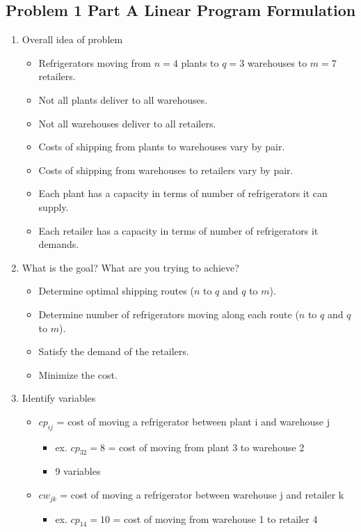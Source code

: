 \documentclass[../report/main.tex]{subfiles}
\begin{document}
\subsection*{Problem 1 Part A Linear Program Formulation}
\begin{enumerate}[1.]
	\item Overall idea of problem
	\begin{itemize}
		\item Refrigerators moving from $n=4$ plants to $q=3$ warehouses to $m=7$ retailers.
		\item Not all plants deliver to all warehouses.
		\item Not all warehouses deliver to all retailers.
		\item Costs of shipping from plants to warehouses vary by pair.
		\item Costs of shipping from warehouses to retailers vary by pair.
		\item Each plant has a capacity in terms of number of refrigerators it can supply.
		\item Each retailer has a capacity in terms of number of refrigerators it demands.
	\end{itemize}
	\item What is the goal?  What are you trying to achieve?
	\begin{itemize}
		\item Determine optimal shipping routes ($n$ to $q$ and $q$ to $m$).
		\item Determine number of refrigerators moving along each route ($n$ to $q$ and $q$ to $m$).
		\item Satisfy the demand of the retailers.
		\item Minimize the cost.
	\end{itemize}
	\item Identify variables
	\begin{itemize}
		\item $cp_{ij}$ = cost of moving a refrigerator between plant i and warehouse j
		\begin{itemize}
			\item   ex. $cp_{32} = 8$ = cost of moving from plant 3 to warehouse 2
			\item   9 variables
		\end{itemize}
		\item $cw_{jk}$ = cost of moving a refrigerator between warehouse j and retailer k
		\begin{itemize}
  			\item  ex. $cp_{14} = 10$ = cost of moving from warehouse 1 to retailer 4

\end{itemize}
\end{itemize}
\end{enumerate}
\end{document}
